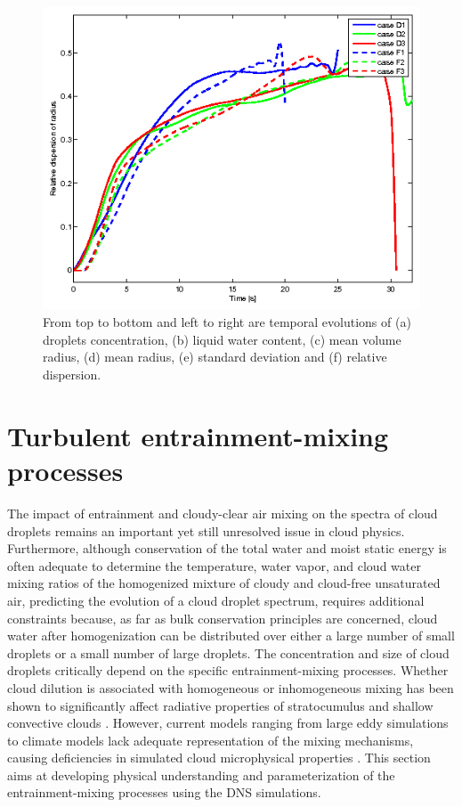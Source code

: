 \documentclass[draft,jgrga]{AGUTeX}
\begin{document}
\begin{article}
\begin{figure}[!htbp]
\includegraphics[width=0.48\linewidth]{Figures/dsp_radius}
\caption{From top to bottom and left to right are temporal evolutions of (a) droplets concentration, (b) liquid water content, (c) mean volume radius, (d) mean radius, (e) standard deviation and (f) relative dispersion.}\label{fig:temporal_variation} 
\end{figure}

\section{Turbulent entrainment-mixing processes}\label{mixing_processes}

The impact of entrainment and cloudy-clear air mixing on the spectra of cloud droplets remains an important yet still unresolved issue in cloud physics. Furthermore, although conservation of the total water and moist static energy is often adequate to determine the temperature, water vapor, and cloud water mixing ratios of the homogenized mixture of cloudy and cloud-free unsaturated air,  predicting the evolution of a cloud droplet spectrum, requires additional constraints because, as far as bulk conservation principles are concerned, cloud water after homogenization can be distributed over either a large number of small droplets or a small number of large droplets. The concentration and size of cloud droplets critically depend on the specific entrainment-mixing processes. Whether cloud dilution is associated with homogeneous or inhomogeneous mixing has been shown to significantly affect radiative properties of stratocumulus \cite{Chosson2007} and shallow convective clouds \cite{Grabowski2006, Slawinska2008}. However, current models ranging from large eddy simulations to climate models lack adequate representation of the mixing mechanisms, causing deficiencies in simulated cloud microphysical properties \cite{Endo2015}. This section aims at developing physical understanding and parameterization of the entrainment-mixing processes using the DNS simulations. 


\end{article}
\end{document}

